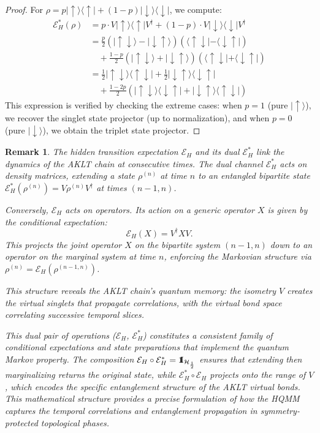 \documentclass[12pt,a4paper]{article}
\newtheorem{remark}[theorem]{Remark}
\def\id{{\bf 1}\!\!{\rm I}}
\begin{document}
\begin{proof}
For $\rho = p|\uparrow\rangle\langle\uparrow| + (1-p)|\downarrow\rangle\langle\downarrow|$, we compute:
\begin{align*}
\mathcal{E}_H^*(\rho) &= p \cdot V|\uparrow\rangle\langle\uparrow|V^\dagger + (1-p) \cdot V|\downarrow\rangle\langle\downarrow|V^\dagger \\
&= \frac{p}{2}(|\uparrow\downarrow\rangle - |\downarrow\uparrow\rangle)(\langle\uparrow\downarrow| - \langle\downarrow\uparrow|) \\
&\quad + \frac{1-p}{2}(|\uparrow\downarrow\rangle + |\downarrow\uparrow\rangle)(\langle\uparrow\downarrow| + \langle\downarrow\uparrow|) \\
&= \frac{1}{2}|\uparrow\downarrow\rangle\langle\uparrow\downarrow| + \frac{1}{2}|\downarrow\uparrow\rangle\langle\downarrow\uparrow| \\
&\quad + \frac{1-2p}{2}(|\uparrow\downarrow\rangle\langle\downarrow\uparrow| + |\downarrow\uparrow\rangle\langle\uparrow\downarrow|)
\end{align*}
This expression is verified by checking the extreme cases: when $p=1$ (pure $|\uparrow\rangle$), we recover the singlet state projector (up to normalization), and when $p=0$ (pure $|\downarrow\rangle$), we obtain the triplet state projector.
\end{proof}

\begin{remark}
  The hidden transition expectation $\mathcal{E}_H$ and its dual $\mathcal{E}_H^*$ link the dynamics of the AKLT chain at consecutive times. The dual channel $\mathcal{E}_H^*$ acts on density matrices, extending a state $\rho^{(n)}$ at time $n$ to an entangled bipartite state $\mathcal{E}_H^*(\rho^{(n)}) = V\rho^{(n)}V^\dagger$ at times $(n-1,n)$.

Conversely, $\mathcal{E}_H$ acts on operators. Its action on a generic operator $X$ is given by the conditional expectation:
\[
\mathcal{E}_H(X) = V^\dagger X V.
\]
This projects the joint operator $X$ on the bipartite system $(n-1,n)$ down to an operator on the marginal system at time $n$, enforcing the Markovian structure via $\rho^{(n)} = \mathcal{E}_H(\rho^{(n-1,n)})$.

This structure reveals the AKLT chain's quantum memory: the isometry $V$ creates the virtual singlets that propagate correlations, with the virtual bond space correlating successive temporal slices.

This dual pair of operations ($\mathcal{E}_H$, $\mathcal{E}_H^*$) constitutes a consistent family of conditional expectations and state preparations that implement the quantum Markov property. The composition $\mathcal{E}_H \circ \mathcal{E}_H^* = \id_{\mathcal{H}_{\frac{1}{2}}}$ ensures that extending then marginalizing returns the original state, while $\mathcal{E}_H^* \circ \mathcal{E}_H$ projects onto the range of $V$, which encodes the specific entanglement structure of the AKLT virtual bonds. This mathematical structure provides a precise formulation of how the HQMM captures the temporal correlations and entanglement propagation in symmetry-protected topological phases.
\end{remark}
\end{document}
